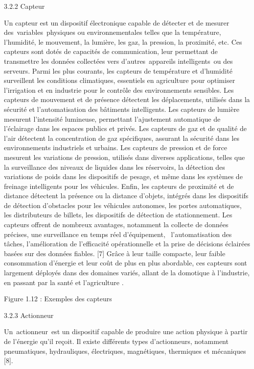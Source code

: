 \documentclass{article}
\begin{document}
3.2.2 Capteur

Un capteur est un dispositif électronique capable de détecter et de mesurer des variables physiques ou environnementales telles que la température, l’humidité, le mouvement, la lumière, les gaz, la pression, la proximité, etc. Ces capteurs sont dotés de capacités de communication, leur permettant de transmettre les données collectées vers d’autres appareils intelligents ou des serveurs. Parmi les plus courants, les capteurs de température et d’humidité surveillent les conditions climatiques, essentiels en agriculture pour optimiser l'irrigation et en industrie pour le contrôle des environnements sensibles. Les capteurs de mouvement et de présence détectent les déplacements, utilisés dans la sécurité et l'automatisation des bâtiments intelligents. Les capteurs de lumière mesurent l'intensité lumineuse, permettant l'ajustement automatique de l'éclairage dans les espaces publics et privés. Les capteurs de gaz et de qualité de l'air détectent la concentration de gaz spécifiques, assurant la sécurité dans les environnements industriels et urbains. Les capteurs de pression et de force mesurent les variations de pression, utilisés dans diverses applications, telles que la surveillance des niveaux de liquides dans les réservoirs, la détection des variations de poids dans les dispositifs de pesage, et même dans les systèmes de freinage intelligents pour les véhicules. Enfin, les capteurs de proximité et de distance détectent la présence ou la distance d'objets, intégrés dans les dispositifs de détection d’obstacles pour les véhicules autonomes, les portes automatiques, les distributeurs de billets, les dispositifs de détection de stationnement. Les capteurs offrent de nombreux avantages, notamment la collecte de données précises, une surveillance en temps réel d’équipement,  l’automatisation des tâches, l’amélioration de l’efficacité opérationnelle et la prise de décisions éclairées basées sur des données fiables. [7] Grâce à leur taille compacte, leur faible consommation d'énergie et leur coût de plus en plus abordable, ces capteurs sont largement déployés dans des domaines variés, allant de la domotique à l'industrie, en passant par la santé et l'agriculture .

Figure 1.12 : Exemples des capteurs

3.2.3 Actionneur

Un actionneur est un dispositif capable de produire une action physique à partir de l’énergie qu’il reçoit. Il existe différents types d'actionneurs, notamment pneumatiques, hydrauliques, électriques, magnétiques, thermiques et mécaniques [8].
\end{document}
